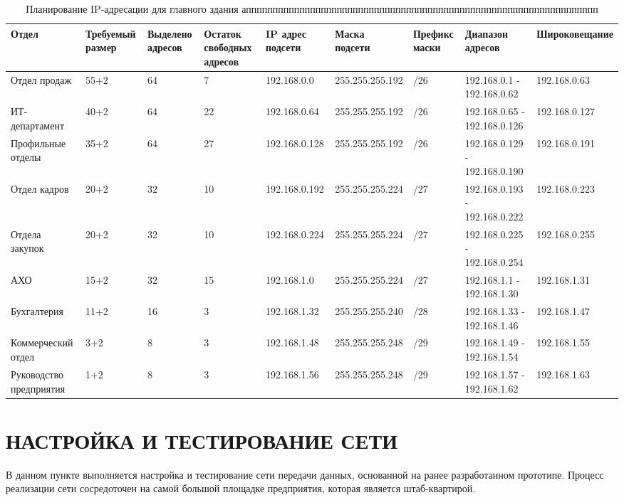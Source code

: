 \documentclass[14pt, a4paper]{extarticle}
\numberwithin{equation}{section}
\begin{document}
\begin{landscape}
\begin{table}[H]
\centering
\small
\caption{Планирование IP-адресации для главного здания апппппппппппппппппппппппппппппппппппппппппппппппппппппппппппппппппп}
\begin{tabular}{|m{3cm}|m{2cm}|m{2cm}|m{2cm}|m{2.3cm}|m{3cm}|m{2.2cm}|m{2.6cm}|m{3.6cm}|}
\hline
\textbf{Отдел} & \textbf{Требуемый размер} & \textbf{Выделено адресов} & \textbf{Остаток свободных адресов} & \textbf{IP адрес подсети} & \textbf{Маска подсети} & \textbf{Префикс маски} & \textbf{Диапазон адресов} & \textbf{Широковещание} \\
\hline
Отдел продаж & 55+2 & 64 & 7 & 192.168.0.0 & 255.255.255.192 & /26 & 192.168.0.1 - 192.168.0.62 & 192.168.0.63 \\
\hline
ИТ-департамент & 40+2 & 64 & 22 & 192.168.0.64 & 255.255.255.192 & /26 & 192.168.0.65 - 192.168.0.126 & 192.168.0.127 \\
\hline
Профильные отделы & 35+2 & 64 & 27 & 192.168.0.128 & 255.255.255.192 & /26 & 192.168.0.129 - 192.168.0.190 & 192.168.0.191 \\
\hline
Отдел кадров & 20+2 & 32 & 10 & 192.168.0.192 & 255.255.255.224 & /27 & 192.168.0.193 - 192.168.0.222 & 192.168.0.223 \\
\hline
Отдела закупок & 20+2 & 32 & 10 & 192.168.0.224 & 255.255.255.224 & /27 & 192.168.0.225 - 192.168.0.254 & 192.168.0.255 \\
\hline
АХО & 15+2 & 32 & 15 & 192.168.1.0 & 255.255.255.224 & /27 & 192.168.1.1 - 192.168.1.30 & 192.168.1.31 \\
\hline
Бухгалтерия & 11+2 & 16 & 3 & 192.168.1.32 & 255.255.255.240 & /28 & 192.168.1.33 - 192.168.1.46 & 192.168.1.47 \\
\hline
Коммерческий отдел & 3+2 & 8 & 3 & 192.168.1.48 & 255.255.255.248 & /29 & 192.168.1.49 - 192.168.1.54 & 192.168.1.55 \\
\hline
Руководство предприятия & 1+2 & 8 & 3 & 192.168.1.56 & 255.255.255.248 & /29 & 192.168.1.57 - 192.168.1.62 & 192.168.1.63 \\
\hline
\end{tabular}
\label{table:2:mainDepIPplanning}
\end{table}
\end{landscape}
\newpage


\section{НАСТРОЙКА И ТЕСТИРОВАНИЕ СЕТИ}
В данном пункте выполняется настройка и тестирование сети передачи
данных, основанной на ранее разработанном прототипе. Процесс реализации
сети сосредоточен на самой большой площадке предприятия, которая является
штаб-квартирой.
\end{document}
